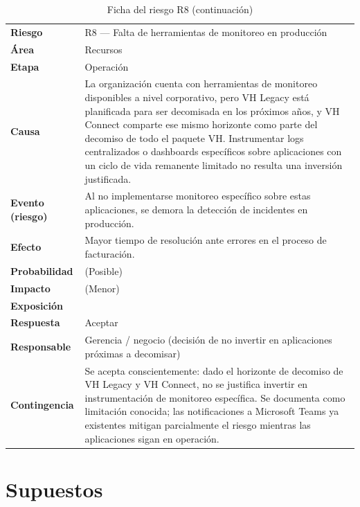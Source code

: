 \begin{longtable}[]{@{}
  >{\raggedright\arraybackslash}p{}
  >{\raggedright\arraybackslash}p{}@{}}
\caption{Ficha del riesgo R8}\label{tab:12}\\
\toprule\noalign{}
\endfirsthead
\caption[]{Ficha del riesgo R8 (continuación)}\\
\toprule\noalign{}
\endhead
\bottomrule\noalign{}
\endlastfoot
\textbf{Riesgo} & R8 --- Falta de herramientas de monitoreo en producción \\
\textbf{Área} & Recursos \\
\textbf{Etapa} & Operación \\
\textbf{Causa} & La organización cuenta con herramientas de monitoreo disponibles a nivel corporativo, pero VH Legacy está planificada para ser decomisada en los próximos años, y VH Connect comparte ese mismo horizonte como parte del decomiso de todo el paquete VH. Instrumentar logs centralizados o dashboards específicos sobre aplicaciones con un ciclo de vida remanente limitado no resulta una inversión justificada. \\
\textbf{Evento (riesgo)} & Al no implementarse monitoreo específico sobre estas aplicaciones, se demora la detección de incidentes en producción. \\
\textbf{Efecto} & Mayor tiempo de resolución ante errores en el proceso de facturación. \\
\textbf{Probabilidad} & 3 (Posible) \\
\textbf{Impacto} & 2 (Menor) \\
\textbf{Exposición} & 6 \\
\textbf{Respuesta} & Aceptar \\
\textbf{Responsable} & Gerencia / negocio (decisión de no invertir en aplicaciones próximas a decomisar) \\
\textbf{Contingencia} & Se acepta conscientemente: dado el horizonte de decomiso de VH Legacy y VH Connect, no se justifica invertir en instrumentación de monitoreo específica. Se documenta como limitación conocida; las notificaciones a Microsoft Teams ya existentes mitigan parcialmente el riesgo mientras las aplicaciones sigan en operación. \\
\end{longtable}

\section{Supuestos}

